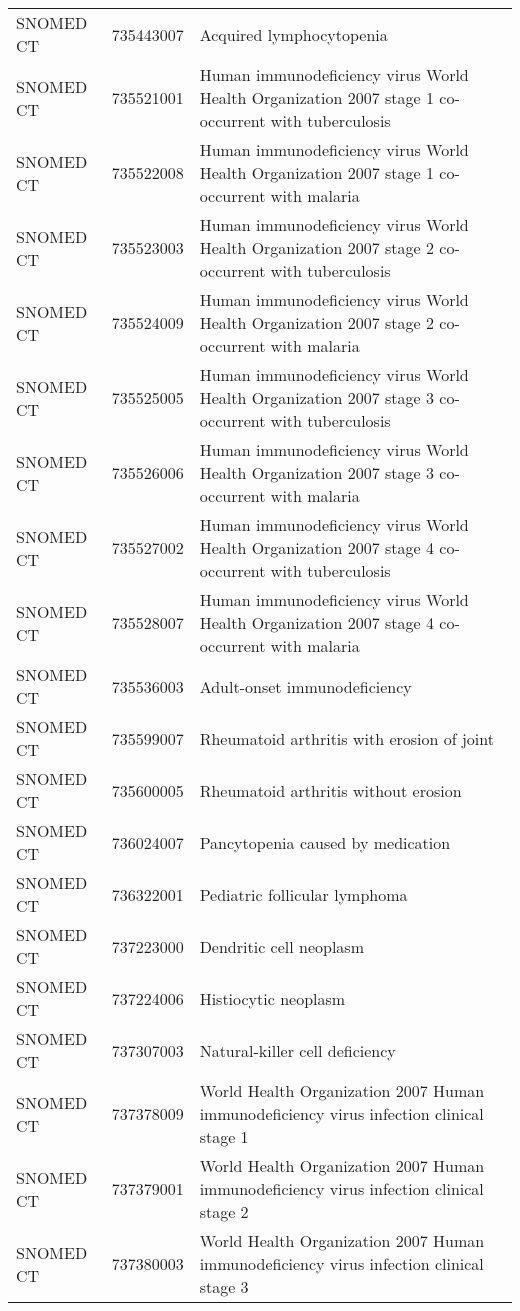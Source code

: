 \begin{table}[ht]
\begin{tabular}{lll}
  SNOMED CT & 735443007 & Acquired lymphocytopenia \\ 
  SNOMED CT & 735521001 & Human immunodeficiency virus World Health Organization 2007 stage 1 co-occurrent with tuberculosis \\ 
  SNOMED CT & 735522008 & Human immunodeficiency virus World Health Organization 2007 stage 1 co-occurrent with malaria \\ 
  SNOMED CT & 735523003 & Human immunodeficiency virus World Health Organization 2007 stage 2 co-occurrent with tuberculosis \\ 
  SNOMED CT & 735524009 & Human immunodeficiency virus World Health Organization 2007 stage 2 co-occurrent with malaria \\ 
  SNOMED CT & 735525005 & Human immunodeficiency virus World Health Organization 2007 stage 3 co-occurrent with tuberculosis \\ 
  SNOMED CT & 735526006 & Human immunodeficiency virus World Health Organization 2007 stage 3 co-occurrent with malaria \\ 
  SNOMED CT & 735527002 & Human immunodeficiency virus World Health Organization 2007 stage 4 co-occurrent with tuberculosis \\ 
  SNOMED CT & 735528007 & Human immunodeficiency virus World Health Organization 2007 stage 4 co-occurrent with malaria \\ 
  SNOMED CT & 735536003 & Adult-onset immunodeficiency \\ 
  SNOMED CT & 735599007 & Rheumatoid arthritis with erosion of joint \\ 
  SNOMED CT & 735600005 & Rheumatoid arthritis without erosion \\ 
  SNOMED CT & 736024007 & Pancytopenia caused by medication \\ 
  SNOMED CT & 736322001 & Pediatric follicular lymphoma \\ 
  SNOMED CT & 737223000 & Dendritic cell neoplasm \\ 
  SNOMED CT & 737224006 & Histiocytic neoplasm \\ 
  SNOMED CT & 737307003 & Natural-killer cell deficiency \\ 
  SNOMED CT & 737378009 & World Health Organization 2007 Human immunodeficiency virus infection clinical stage 1 \\ 
  SNOMED CT & 737379001 & World Health Organization 2007 Human immunodeficiency virus infection clinical stage 2 \\ 
  SNOMED CT & 737380003 & World Health Organization 2007 Human immunodeficiency virus infection clinical stage 3 \\ 

\end{tabular}
\end{table}
